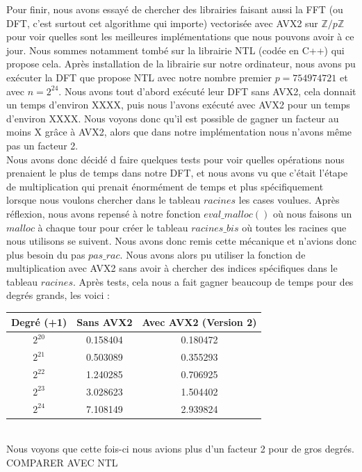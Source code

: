 \documentclass[12pt, a4paper]{article}
\begin{document}
Pour finir, nous avons essayé de chercher des librairies faisant aussi la FFT (ou DFT, c'est surtout cet algorithme qui importe) vectorisée avec AVX2 sur $\mathbb{Z}/p\mathbb{Z}$ pour voir quelles sont les meilleures implémentations que nous pouvons avoir à ce jour. Nous sommes notamment tombé sur la librairie NTL (codée en C++) qui propose cela. Après installation de la librairie sur notre ordinateur, nous avons pu exécuter la DFT que propose NTL avec notre nombre premier $p = 754974721$ et avec $n = 2^{24}$. Nous avons tout d'abord exécuté leur DFT sans AVX2, cela donnait un temps d'environ XXXX, puis nous l'avons exécuté avec AVX2 pour un temps d'environ XXXX. Nous voyons donc qu'il est possible de gagner un facteur au moins X grâce à AVX2, alors que dans notre implémentation nous n'avons même pas un facteur 2. \\
\indent Nous avons donc décidé d faire quelques tests pour voir quelles opérations nous prenaient le plus de temps dans notre DFT, et nous avons vu que c'était l'étape de multiplication qui prenait énormément de temps et plus spécifiquement lorsque nous voulons chercher dans le tableau $racines$ les cases voulues. Après réflexion, nous avons repensé à notre fonction $eval\_malloc()$ où nous faisons un $malloc$ à chaque tour pour créer le tableau $racines\_bis$ où toutes les racines que nous utilisons se suivent. Nous avons donc remis cette mécanique et n'avions donc plus besoin du pas $pas\_rac$. Nous avons alors pu utiliser la fonction de multiplication avec AVX2 sans avoir à chercher des indices spécifiques dans le tableau $racines$. Après tests, cela nous a fait gagner beaucoup de temps pour des degrés grands, les voici : 

\begin{center}
\begin{tabular}{||c c c||}
\hline
Degré (+1) & Sans AVX2 & Avec AVX2 (Version 2) \\
\hline\hline
$2^{20}$ & 0.158404 & 0.180472 \\
\hline
$2^{21}$ & 0.503089 & 0.355293 \\
\hline
$2^{22}$ & 1.240285 & 0.706925 \\
\hline
$2^{23}$ & 3.028623 & 1.504402 \\
\hline
$2^{24}$ & 7.108149 & 2.939824 \\
\hline
\end{tabular}
\end{center}
{}
\ \\
\indent Nous voyons que cette fois-ci nous avions plus d'un facteur 2 pour de gros degrés. COMPARER AVEC NTL
\end{document}
